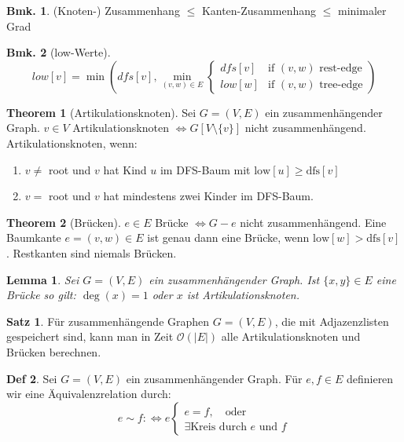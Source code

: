 \documentclass[a4paper, 10pt]{article}
\newtheorem*{lemma}{Lemma}
\theoremstyle{definition}
\newtheorem{definition}{Def}[section]
\newtheorem{theorem}[definition]{Satz}
\newtheorem*{note}{Bmk.}
\theoremstyle{named}
\newtheorem*{ntheorem}{Theorem}
\newcommand{\BO}{\mathcal{O}}
\begin{document}
\begin{note}
    (Knoten-) Zusammenhang $\leq$ Kanten-Zusammenhang $\leq$ minimaler Grad
\end{note}

\begin{note}[low-Werte]
    $$low[v] = \min\left(dfs[v], \min_{(v, w) \in E} \begin{cases} dfs[v] & \text{if $(v, w)$ rest-edge} \\ low[w] & \text{if $(v, w)$ tree-edge}\end{cases} \right)$$
\end{note}

\begin{ntheorem}[Artikulationsknoten]
    Sei $G = (V, E)$ ein zusammenhängender Graph. $v \in V$ Artikulationsknoten $\iff G[V\setminus \{v\}]$ nicht zusammenhängend. Artikulationsknoten, wenn:
    \begin{enumerate}
        \item $v \neq$ root und $v$ hat Kind $u$ im DFS-Baum mit $\text{low}[u] \geq \text{dfs}[v]$
        \item $v = $ root und $v$ hat mindestens zwei Kinder im DFS-Baum.
    \end{enumerate}
\end{ntheorem}

\begin{ntheorem}[Brücken]
    $e \in E$ Brücke $\iff G-e$ nicht zusammenhängend.
    Eine Baumkante $e = (v, w) \in E$ ist genau dann eine Brücke, wenn $\text{low}[w] > \text{dfs}[v]$. Restkanten sind niemals Brücken. 
\end{ntheorem}

\begin{lemma}
    Sei $G = (V, E)$ ein zusammenhängender Graph. Ist $\{x, y\} \in E$ eine Brücke so gilt: $\deg(x) = 1$ oder $x$ ist Artikulationsknoten.
\end{lemma}

\setcounter{definition}{27}
\begin{theorem}
    Für zusammenhängende Graphen $G = (V, E)$, die mit Adjazenzlisten gespeichert sind, kann man in Zeit $\BO(|E|)$ alle Artikulationsknoten und Brücken berechnen.
\end{theorem}

\begin{definition}
    Sei $G = (V, E)$ ein zusammenhängender Graph. Für $e, f \in E$ definieren wir eine Äquivalenzrelation durch:
    $$e \sim f :\iff e \begin{cases}
        e = f, \quad \text{oder} \\
        \exists \text{Kreis durch $e$ und $f$}
    \end{cases}$$
\end{definition}
\end{document}

